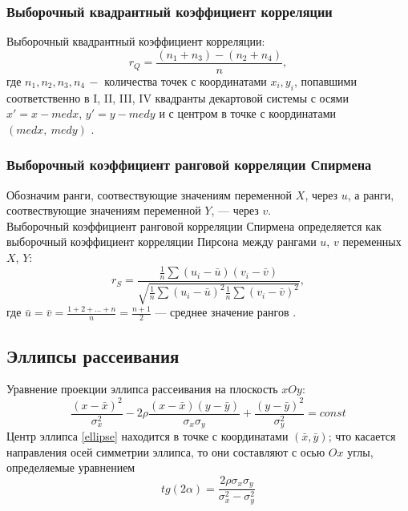 \subsubsection{Выборочный квадрантный коэффициент корреляции}
\begin{flushleft}
	Выборочный квадрантный коэффициент корреляции:
	\begin{equation}
		r_{Q} = \frac{(n_{1} + n_{3}) - (n_{2} + n_{4})}{n},
		\label{rQ}
	\end{equation}
	где $n_1, n_2, n_3, n_4 \,- $ количества точек с координатами $x_i, y_i$, попавшими соответственно в I, II, III, IV квадранты декартовой системы с осями $x'=x-med x$, $y'=y-med y$ и с центром в точке с координатами $(med x,~med y)$ \cite[с.~539]{1}.
\end{flushleft}

\subsubsection{Выборочный коэффициент ранговой корреляции Спирмена}
\begin{flushleft}
	Обозначим ранги, соотвествующие значениям переменной $X$, через $u$, а ранги, соотвествующие значениям переменной $Y$, — через $v$. \\
	Выборочный коэффициент ранговой корреляции Спирмена определяется как выборочный коэффициент корреляции Пирсона между рангами $u$, $v$ переменных $X$, $Y$:
	\begin{equation}
		r_{S} = \frac{
			\frac{1}{n}\sum{(u_{i} - \bar{u})(v_{i}-\bar{v})}
		}{
			\sqrt{\frac{1}{n}\sum{(u_{i} - \bar{u})^{2}}\frac{1}{n}\sum{(v_{i} - \bar{v})^{2}}}
		},
		\label{rS}
	\end{equation}
	где $\bar{u} = \bar{v} = \frac{1 + 2 + ... + n}{n} = \frac{n + 1}{2}$ — среднее значение рангов \cite[с.~540-541]{1}.
\end{flushleft}

\subsection{Эллипсы рассеивания}
\begin{flushleft}
	Уравнение проекции эллипса рассеивания на плоскость $xOy$:
	\begin{equation}
		\frac{(x-\bar{x})^{2}}{\sigma_{x}^{2}} - 
		2\rho\frac{(x-\bar{x})(y-\bar{y})}{\sigma_{x}\sigma_{y}}+
		\frac{(y-\bar{y})^{2}}{\sigma_{y}^{2}} = const
		\label{ellipse}
	\end{equation}
	Центр эллипса \ref{ellipse} находится в точке с координатами $(\bar{x},\bar{y})$; что касается направления осей симметрии эллипса, то они составляют с осью $Ox$ углы, определяемые уравнением
	\begin{equation}
		tg(2\alpha) = \frac{2\rho\sigma_{x}\sigma_{y}}{\sigma_{x}^{2} - \sigma_{y}^{2}}
		\label{angle}
	\end{equation}
\end{flushleft}

